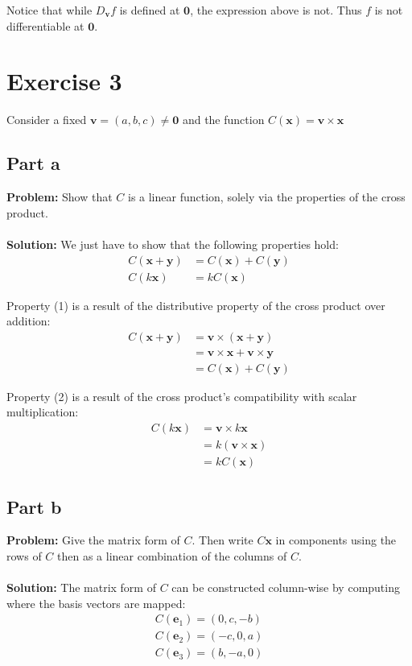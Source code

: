 \documentclass{article}
\begin{document}
Notice that while $D_{\mathbf v}f$ is defined at $\mathbf 0$, the expression above is not. Thus $f$ is not differentiable at $\mathbf 0$.

\section*{Exercise 3}
Consider a fixed $\mathbf v=(a,b,c)\not=\mathbf 0$ and the function $C(\mathbf x)=\mathbf v\times\mathbf x$
\subsection*{Part a}
\textbf{Problem:} Show that $C$ is a linear function, solely via the properties of the cross product.
\\\\
\textbf{Solution:} We just have to show that the following properties hold:
\begin{align}
  C(\mathbf x+\mathbf y)&=C(\mathbf x)+C(\mathbf y)\\
  C(k\mathbf x)&=kC(\mathbf x)
\end{align}

Property (1) is a result of the distributive property of the cross product over addition:
\begin{align*}
  C(\mathbf x+\mathbf y)&=\mathbf v\times(\mathbf x+\mathbf y)\tag{def. of $C$}\\
  &=\mathbf v\times\mathbf x+\mathbf v\times\mathbf y\tag{distributive prop.}\\
  &=C(\mathbf x)+C(\mathbf y)\tag{def of $C$}
\end{align*}

Property (2) is a result of the cross product's compatibility with scalar multiplication:
\begin{align*}
  C(k\mathbf x)&=\mathbf v\times k\mathbf x\tag{def. of $C$}\\
  &=k(\mathbf v\times\mathbf x)\tag{scalar prop.}\\
  &=kC(\mathbf x)\tag{def of $C$}
\end{align*}

\subsection*{Part b}
\textbf{Problem:} Give the matrix form of $C$. Then write $C\mathbf x$ in components using the rows of $C$ then as a linear combination of the columns of $C$.
\\\\
\textbf{Solution:} The matrix form of $C$ can be constructed column-wise by computing where the basis vectors are mapped:
\begin{align*}
  C(\mathbf e_1)=(0,c,-b)\\
  C(\mathbf e_2)=(-c,0,a)\\
  C(\mathbf e_3)=(b,-a,0)\\
\end{align*}
\end{document}

